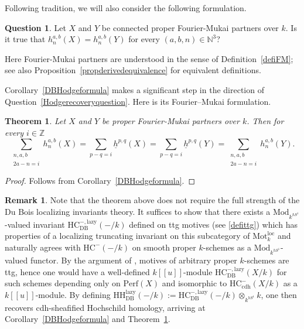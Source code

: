 \documentclass{amsart}
\theoremstyle{plain}
\newtheorem{theorem}[prop]{Theorem}
\theoremstyle{definition}
\newtheorem{ques}[prop]{Question}
\newtheorem{remark}[prop]{Remark}
\newcommand{\bbN}{\mathbb{N}}
\newcommand{\bbZ}{\mathbb{Z}}
\newcommand{\Perf}{\mathrm{Perf}}
\newcommand{\Motloc}{\mathrm{Mot}^{\mathrm{loc}}}
\newcommand{\HH}{\mathrm{HH}}
\newcommand{\HC}{\mathrm{HC}}
\newcommand{\Mod}{\mathrm{Mod}}
\newcommand{\DB}{\mathrm{DB}}
\newcommand{\cdh}{\mathrm{cdh}}
\begin{document}
Following tradition, we will also consider the following formulation.

\begin{ques}\label{FMquestion}
Let $X$ and $Y$ be connected proper Fourier-Mukai partners over $k$. Is it true that $h^{a,b}_n(X)=h^{a,b}_n(Y)$ for every $(a,b,n)\in \bbN^3$?
\end{ques}

Here Fourier-Mukai partners are understood in the sense of Definition~\ref{defiFM}; see also Proposition~\ref{propderivedequivalence} for equivalent definitions.

\medskip

Corollary~\ref{DBHodgeformula} makes a significant step in the direction of Question~\ref{Hodgerecoveryquestion}. Here is its Fourier--Mukai formulation.

\begin{theorem}\label{FMcolumns}
Let $X$ and $Y$ be proper Fourier-Mukai partners over $k$. Then for every $i\in\bbZ$
\[\sum_{\substack{n,a,b\\2a-n=i}}h_n^{a,b}(X)
 =\sum_{p-q=i}\underline h^{p,q}(X)
 =\sum_{p-q=i}\underline h^{p,q}(Y)
 =\sum_{\substack{n,a,b\\2a-n=i}}h_n^{a,b}(Y) .\]
\end{theorem}

\begin{proof}
Follows from Corollary~\ref{DBHodgeformula}.
\end{proof}

\begin{remark}
Note that the theorem above does not require the full strength of the Du Bois localizing invariants theory. It suffices to show that there exists a $\Mod_{k^{hS^1}}$-valued invariant $\HC^{-,\mathrm{lazy}}_{\DB}(-/k)$ defined on ttg motives (see \ref{defittg}) which has properties of a localizing truncating invariant on this subcategory of $\Motloc_k$ and naturally agrees with $\HC^-(-/k)$ on smooth proper $k$-schemes as a $\Mod_{k^{hS^1}}$-valued functor.
By the argument of \cite[Appendix A]{LT19}, motives of arbitrary proper $k$-schemes are ttg, hence one would have a well-defined $k[[u]]$-module $\HC^{-,\mathrm{lazy}}_{\DB}(X/k)$ for such schemes depending only on $\Perf(X)$ and isomorphic to $\HC^{-}_{\cdh}(X/k)$ as a $k[[u]]$-module. By defining $\HH_{\DB}^{\mathrm{lazy}}(-/k):=\HC^{-,\mathrm{lazy}}_{\DB}(-/k)\otimes_{k^{hS^1}}k$, one then recovers cdh-sheafified Hochschild homology, arriving at Corollary~\ref{DBHodgeformula} and Theorem~\ref{FMcolumns}.    
\end{remark}
\end{document}
